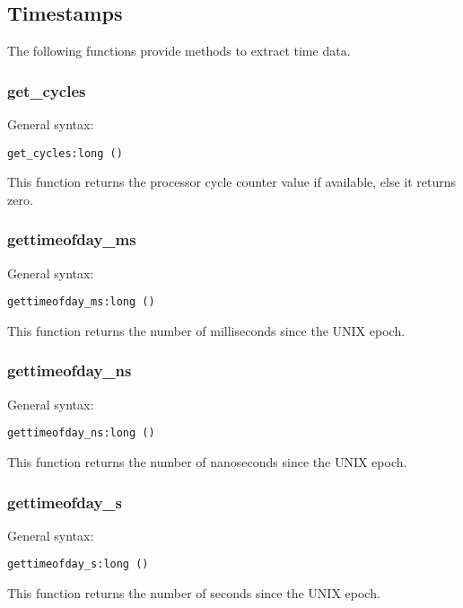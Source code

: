 \documentclass[twoside,english]{article}
\newenvironment{vindent}
{\begin{list}{}{\setlength{\listparindent}{6pt}}
\item[]}
{\end{list}}
\begin{document}
\subsection{Timestamps}
The following functions provide methods to extract time data.


\subsubsection{get\_cycles}
General syntax:

\begin{vindent}
\begin{verbatim}
get_cycles:long ()
\end{verbatim}
\end{vindent}
This function returns the processor cycle counter value if available, else
it returns zero.


\subsubsection{gettimeofday\_ms}
General syntax:

\begin{vindent}
\begin{verbatim}
gettimeofday_ms:long ()
\end{verbatim}
\end{vindent}
This function returns the number of milliseconds since the UNIX epoch.


\subsubsection{gettimeofday\_ns}
General syntax:

\begin{vindent}
\begin{verbatim}
gettimeofday_ns:long ()
\end{verbatim}
\end{vindent}
This function returns the number of nanoseconds since the UNIX epoch.


\subsubsection{gettimeofday\_s}
General syntax:

\begin{vindent}
\begin{verbatim}
gettimeofday_s:long ()
\end{verbatim}
\end{vindent}
This function returns the number of seconds since the UNIX epoch.
\end{document}
